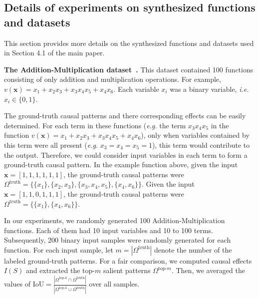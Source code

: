\subsection{Details of experiments on synthesized functions and datasets}
\label{sec:app-synthesized}

This section provides more details on the synthesized functions and datasets used in Section 4.1 of the main paper.

\textbf{The Addition-Multiplication dataset~\cite{zhang2021interpreting}.}
This dataset contained 100 functions consisting of only addition and multiplication operations.
For example, {\small$v(\boldsymbol{x})=x_1+x_2x_3+x_3x_4x_5+x_4x_6$}.
Each variable {\small$x_i$} was a binary variable, \emph{i.e.} {\small$x_i\in\{0,1\}$}.

The ground-truth causal patterns and there corresponding effects can be easily determined.
For each term in these functions (\emph{e.g.} the term {\small $x_3x_4x_5$} in the function {\small $v(\boldsymbol{x})=x_1+x_2x_3+x_3x_4x_5+x_4x_6$}), only when variables contained by this term were all present (\emph{e.g.} {\small$x_3=x_4=x_5=1$}), this term would contribute to the output.
Therefore, we could consider input variables in each term to form a ground-truth causal pattern.
In the  example function above, given the input {\small$\boldsymbol{x}=[1,1,1,1,1,1]$}, the ground-truth causal patterns were {\small$\Omega^{\text{truth}}=\{\{x_1\}, \{x_2,x_3\}, \{x_3,x_4,x_5\}, \{x_4, x_6\}\}$}.
Given the input {\small$\boldsymbol{x}=[1,1,0,1,1,1]$}, the ground-truth causal patterns were {\small$\Omega^{\text{truth}}=\{\{x_1\},\{x_4, x_6\}\}$}.

In our experiments, we randomly generated 100 Addition-Multiplication functions.
Each of them had 10 input variables and 10 to 100 terms.
Subsequently, 200 binary input samples were randomly generated for each function.
For each input sample, let {\small $m=|\Omega^{\text{truth}}|$} denote the number of the labeled ground-truth patterns.
For a fair comparison, we computed causal effects {\small $I(S)$} and extracted the top-{\small $m$} salient patterns {\small$\Omega^{\text{top-}m}$}.
Then, we averaged the values of {\small$\text{IoU}=\frac{|\Omega^{\text{top-}k} \cap \Omega^{\text{truth}}|}{|\Omega^{\text{top-}k}\cup \Omega^{\text{truth}}|}$} over all samples.

